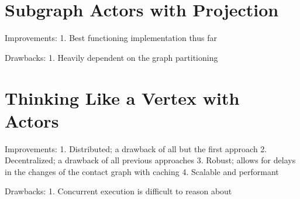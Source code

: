 \section{Subgraph Actors with Projection}\label{sec:projected-subgraphs}

Improvements:
1. Best functioning implementation thus far 

Drawbacks:
1. Heavily dependent on the graph partitioning

\section{Thinking Like a Vertex with Actors}\label{sec:vertex-actors}

Improvements:
1. Distributed; a drawback of all but the first approach
2. Decentralized; a drawback of all previous approaches
3. Robust; allows for delays in the changes of the contact graph with caching
4. Scalable and performant

Drawbacks:
1. Concurrent execution is difficult to reason about